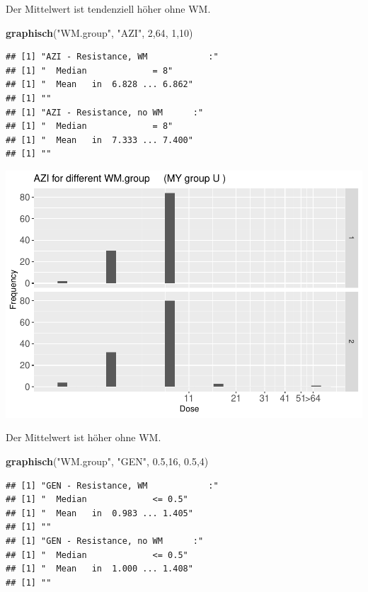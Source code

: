 \documentclass[
]{article}
\newenvironment{Shaded}{\begin{snugshade}}{\end{snugshade}}
\newcommand{\DecValTok}[1]{\textcolor[rgb]{0.00,0.00,0.81}{#1}}
\newcommand{\FloatTok}[1]{\textcolor[rgb]{0.00,0.00,0.81}{#1}}
\newcommand{\KeywordTok}[1]{\textcolor[rgb]{0.13,0.29,0.53}{\textbf{#1}}}
\newcommand{\NormalTok}[1]{#1}
\newcommand{\StringTok}[1]{\textcolor[rgb]{0.31,0.60,0.02}{#1}}
\begin{document}
Der Mittelwert ist tendenziell höher ohne WM.

\begin{Shaded}
\begin{Highlighting}[]
  \KeywordTok{graphisch}\NormalTok{(}\StringTok{"WM.group"}\NormalTok{, }\StringTok{"AZI"}\NormalTok{, }\DecValTok{2}\NormalTok{,}\DecValTok{64}\NormalTok{, }\DecValTok{1}\NormalTok{,}\DecValTok{10}\NormalTok{)}
\end{Highlighting}
\end{Shaded}

\begin{verbatim}
## [1] "AZI - Resistance, WM            :"
## [1] "  Median             = 8"
## [1] "  Mean   in  6.828 ... 6.862"
## [1] ""
## [1] "AZI - Resistance, no WM      :"
## [1] "  Median             = 8"
## [1] "  Mean   in  7.333 ... 7.400"
## [1] ""
\end{verbatim}

\includegraphics{Verteilungen_files/figure-latex/unnamed-chunk-34-1.pdf}

Der Mittelwert ist höher ohne WM.

\begin{Shaded}
\begin{Highlighting}[]
  \KeywordTok{graphisch}\NormalTok{(}\StringTok{"WM.group"}\NormalTok{, }\StringTok{"GEN"}\NormalTok{, }\FloatTok{0.5}\NormalTok{,}\DecValTok{16}\NormalTok{, }\FloatTok{0.5}\NormalTok{,}\DecValTok{4}\NormalTok{)}
\end{Highlighting}
\end{Shaded}

\begin{verbatim}
## [1] "GEN - Resistance, WM            :"
## [1] "  Median             <= 0.5"
## [1] "  Mean   in  0.983 ... 1.405"
## [1] ""
## [1] "GEN - Resistance, no WM      :"
## [1] "  Median             <= 0.5"
## [1] "  Mean   in  1.000 ... 1.408"
## [1] ""
\end{verbatim}
\end{document}
